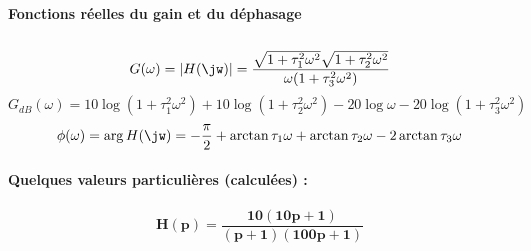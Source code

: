 \paragraph{Fonctions réelles du gain et du déphasage}$\,$\newline
\[
G(\omega)=|H(\jw)|=
\dfrac{\sqrt{1+\tau_1^2\omega^2}\sqrt{1+\tau_2^2\omega^2}}
      {\omega(1+\tau_3^2\omega^2)}
\]
\[
G_{dB}(\omega)=10\log{(1+\tau_1^2\omega^2)}
              +10\log{(1+\tau_2^2\omega^2)}
              -20\log{\omega}
              -20\log{(1+\tau_3^2\omega^2)}
\]
\[
\phi(\omega)=\arg{H(\jw)}=-\frac{\pi}{2}+\arctan{\tau_1\omega}
                                        +\arctan{\tau_2\omega}
                                       -2\arctan{\tau_3\omega}
\]
\paragraph{Quelques valeurs particulières (calculées) :}
\begin{center}
\end{center}
\newpage
\question{}
\[
\boldsymbol{H(p) = \dfrac{10(10p+1)}{(p+1)(100p+1)}}
\]
